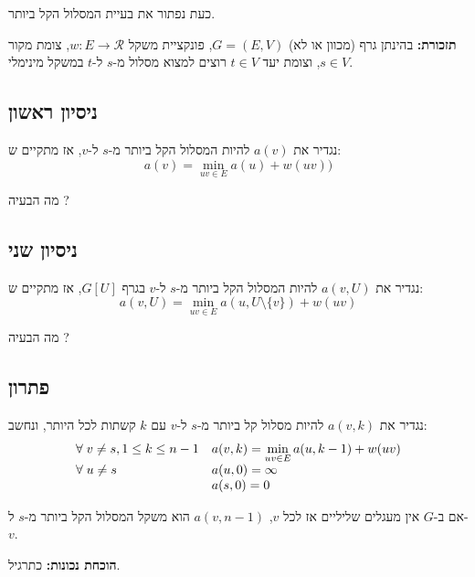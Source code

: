 כעת נפתור את בעיית המסלול הקל ביותר.

\textbf{תזכורת:}
בהינתן גרף (מכוון או לא)
$G = (E, V)$,
פונקציית משקל 
$w:E \to \mathcal{R}$,
צומת מקור 
$s \in V$,
וצומת יעד
$t \in V$
רוצים למצוא מסלול מ-$s$ ל-$t$ במשקל מינימלי.

\subsection*{ניסיון ראשון}
נגדיר את 
$a(v)$
להיות המסלול הקל ביותר מ-$s$ ל-$v$, אז מתקיים ש:%
$$a(v) = \min_{uv \in E} a(u) + w(uv))$$

מה הבעיה ?

\subsection*{ניסיון שני}
נגדיר את 
$a(v, U)$
להיות המסלול הקל ביותר מ-$s$ ל-$v$ בגרף 
$G[U]$, 
אז מתקיים ש:%
$$a(v, U) = \min_{uv \in E} a(u, U \setminus \{v\}) + w(uv)$$

מה הבעיה ?

\subsection*{פתרון}
נגדיר את 
$a(v, k)$
להיות מסלול קל ביותר מ-$s$ ל-$v$ עם $k$ קשתות לכל היותר, ונחשב:%
$$
\begin{array}{l l}
\forall\;
	v \neq s	
	,1 \leq k \leq n - 1
	& a(v, k) = \displaystyle{\min_{uv \in E} a(u, k - 1)} + w(uv)
\\
\forall\; u \neq s						& a(u, 0) = \infty
\\
										& a(s, 0) = 0
\end{array}
$$

\begin{claim}
אם ב-$G$ אין מעגלים שליליים אז לכל $v$, 
$a(v, n - 1)$
הוא משקל המסלול הקל ביותר מ-$s$ ל-$v$.
\end{claim}
\textbf{הוכחת נכונות:}
כתרגיל.

